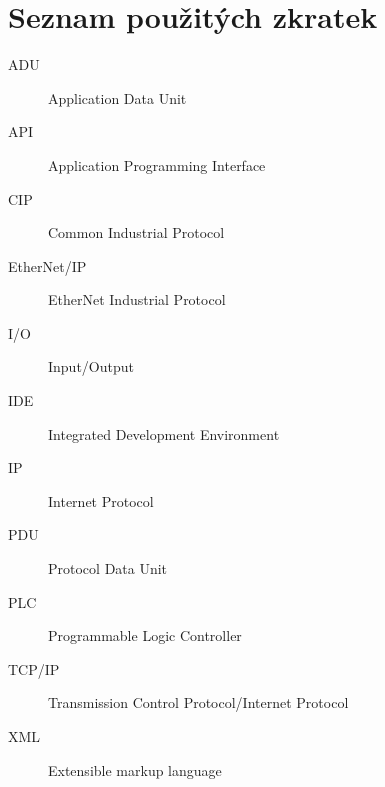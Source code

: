 \chapter{Seznam použitých zkratek}
\begin{description}
	\item[ADU] Application Data Unit
	\item[API] Application Programming Interface
	\item[CIP] Common Industrial Protocol
	\item[EtherNet/IP] EtherNet Industrial Protocol
	\item[I/O] Input/Output
	\item[IDE] Integrated Development Environment 
	\item[IP] Internet Protocol 
	\item[PDU] Protocol Data Unit 
	\item[PLC] Programmable Logic Controller
	\item[TCP/IP] Transmission Control Protocol/Internet Protocol 
	\item[XML] Extensible markup language
\end{description}